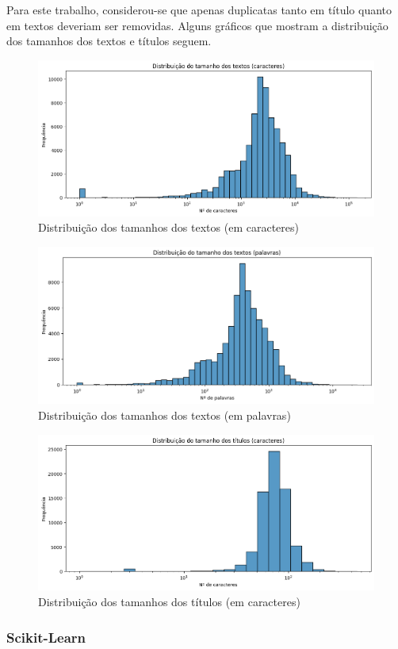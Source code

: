 \documentclass[12pt]{article}
\begin{document}
Para este trabalho, considerou-se que apenas duplicatas tanto em título quanto em textos deveriam ser removidas. Alguns gráficos que mostram a distribuição dos tamanhos dos textos e títulos seguem.

\begin{figure}[h]
	\centering
	\includegraphics[width=0.6\linewidth]{imagens/preproc/tamanho_textos_char.png}
	\caption{Distribuição dos tamanhos dos textos (em caracteres)}
	\label{fig:preproc_tam_txt_char}
\end{figure}


\begin{figure}[h]
	\centering
	\includegraphics[width=0.6\linewidth]{imagens/preproc/tamanho_textos_palavras.png}
	\caption{Distribuição dos tamanhos dos textos (em palavras)}
	\label{fig:preproc_tam_txt_pal}
\end{figure}


\begin{figure}[h]
	\centering
	\includegraphics[width=0.6\linewidth]{imagens/preproc/tamanho_titulos_chars.png}
	\caption{Distribuição dos tamanhos dos títulos (em caracteres)}
	\label{fig:preproc_tam_tit_char}
\end{figure}

\subsubsection{Scikit-Learn}
\end{document}
